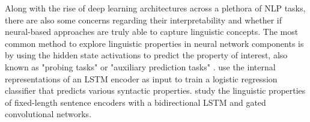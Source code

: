 \documentclass[11pt]{article}
\begin{document}





Along with the rise of deep learning architectures across a plethora of NLP tasks, there are also some concerns regarding their interpretability and whether if neural-based approaches are truly able to capture linguistic concepts. The most common method to explore linguistic properties in neural network components is by using the hidden state activations to predict the property of interest, also known as "probing tasks" \parencite{conneau-etal-2018-cram} or "auxiliary prediction tasks" \parencite{auxilliarypredictiontasks}. \textcite{shi2016string} use the internal representations of an LSTM encoder as input to train a logistic regression classifier that predicts various syntactic properties. \textcite{conneau-etal-2018-cram} study the linguistic properties of fixed-length sentence encoders with a bidirectional LSTM and gated convolutional networks.
\end{document}
